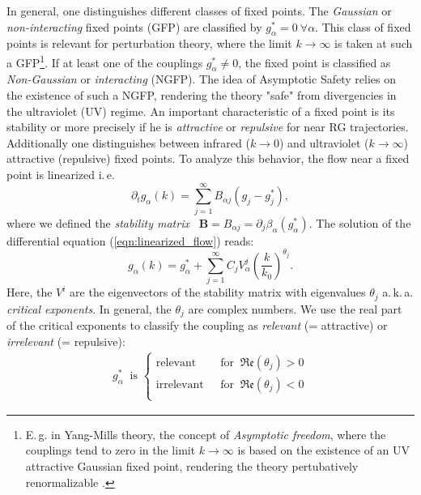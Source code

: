In general, one distinguishes different classes of fixed points. The \textit{Gaussian} or \textit{non-interacting} fixed points  (GFP) are classified by $g^{*}_{\alpha}=0 \ \forall\alpha$. This class of fixed points is relevant for perturbation theory, where the limit $k\rightarrow\infty$ is taken at such a GFP\footnote{E.\,g. in Yang-Mills theory, the concept of \textit{Asymptotic freedom}, where the couplings tend to zero in the limit $k\rightarrow\infty$ is based on the existence of an UV attractive Gaussian fixed point, rendering the theory pertubatively renormalizable \cite{GrossWilczek1973}.}. If at least one of the couplings $g^{*}_{\alpha}\neq 0$, the fixed point is classified as \textit{Non-Gaussian} or \textit{interacting} (NGFP). The idea of Asymptotic Safety relies on the existence of such a NGFP, rendering the theory "safe" from divergencies in the ultraviolet (UV) regime. An important characteristic of a fixed point is its stability or more precisely if he is \textit{attractive} or \textit{repulsive} for near RG trajectories. Additionally one distinguishes between infrared ($k\rightarrow0$) and ultraviolet ($k\rightarrow\infty$) attractive (repulsive) fixed points. To analyze this behavior, the flow near a fixed point is linearized i.\,e.
\begin{equation}
	\partial_{t} g_{\alpha}(k)=\sum_{j=1}^{\infty} B_{\alpha j}\left(g_{j}-g_{j}^{*}\right),
	\label{eqn:linearized_flow}
\end{equation}
where we defined the \textit{stability matrix} \ $\mathbf{B} = B_{\alpha j} = \partial_j\beta_{\alpha}(g^{*}_{\alpha}) $. The solution of the differential equation (\ref{eqn:linearized_flow}) reads:
\begin{equation}
	g_{\alpha}(k)=g_{\alpha}^{*}+\sum_{j=1}^{\infty} C_{j} V_{\alpha}^{j}\left(\frac{k}{k_{0}}\right)^{\theta_{j}}.
\end{equation}
Here, the $V^{i}$ are the eigenvectors of the stability matrix with eigenvalues $\theta_j$ a.\,k.\,a. \textit{critical exponents}. In general, the $\theta_{j}$ are complex numbers. We use the real part of the critical exponents to classify the coupling as \textit{relevant} (= attractive) or \textit{irrelevant} (= repulsive):
\begin{align}
	g^{*}_{\alpha} \ \text{ is } \left\{\begin{array}{ll}{\text{relevant }} & {\text { for } \ \mathfrak{Re}\left(\theta_j\right) > 0} \\[10pt] {\text{irrelevant }} & {\text { for } \  \mathfrak{Re}\left(\theta_j\right) < 0} \\ \end{array}\right.
\end{align}
